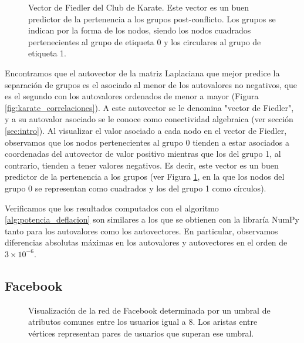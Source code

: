 \documentclass{article}
\begin{document}
\begin{figure}[!ht]
    \centering
    
    \caption{
    Vector de Fiedler del Club de Karate. Este vector es un buen predictor de la pertenencia a los grupos post-conflicto. Los grupos se indican por la forma de los nodos, siendo los nodos cuadrados pertenecientes al grupo de etiqueta 0 y los circulares al grupo de etiqueta 1.
    }
    \label{fig:karate_fiedler}
\end{figure}


Encontramos que el autovector de la matriz Laplaciana que mejor predice la separación de grupos es el asociado al menor de los autovalores no negativos, que es el segundo con los autovalores ordenados de menor a mayor (Figura \ref{fig:karate_correlaciones}). A este autovector se le denomina "vector de Fiedler", y a su autovalor asociado se le conoce como conectividad algebraica (ver sección \ref{sec:intro}). Al visualizar el valor asociado a cada nodo en el vector de Fiedler, observamos que los nodos pertenecientes al grupo 0 tienden a estar asociados a coordenadas del autovector de valor positivo mientras que los del grupo 1, al contrario, tienden a tener valores negativos. Es decir, este vector es un buen predictor de la pertenencia a los grupos (ver Figura \ref{fig:karate_fiedler}, en la que los nodos del grupo 0 se representan como cuadrados y los del grupo 1 como círculos). 


Verificamos que los resultados computados con el algoritmo \ref{alg:potencia_deflacion} son similares a los que se obtienen con la libraría NumPy tanto para los autovalores como los autovectores. En particular, observamos diferencias absolutas máximas en los autovalores y autovectores en el orden de $3 \times 10^{-6}$.



\subsection{Facebook} \label{sec:facebook_resultados}


\begin{figure}[!ht]
    \centering
    
    \caption{
        Visualización de la red de Facebook determinada por un umbral de atributos comunes entre los usuarios igual a 8. Los aristas entre vértices representan pares de usuarios que superan ese umbral.
    } 
    \label{fig:facebook_umbral_arbitrario}
\end{figure}
\end{document}
